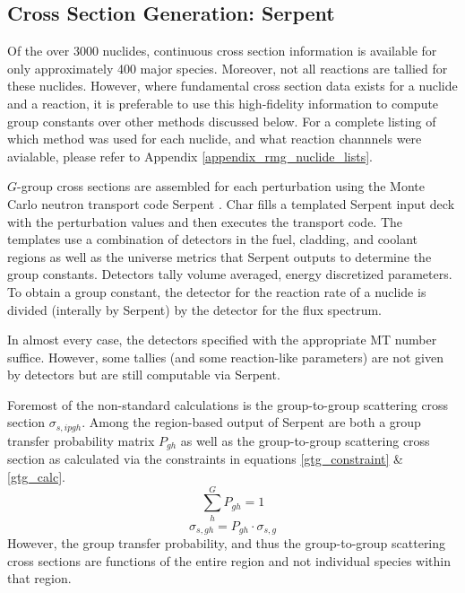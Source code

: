 \subsection{Cross Section Generation: Serpent}
\label{mg:xs_gen_serpent}
Of the over 3000 nuclides, continuous cross section information is available for only 
approximately 400 major species.  Moreover, not all reactions are tallied 
for these nuclides.  However, where fundamental cross section data exists for a nuclide
and a reaction, it is preferable to use this high-fidelity information to compute group
constants over other methods discussed below.  For a complete listing of which method was used for each nuclide, 
and what reaction channnels were avialable, please refer to Appendix \ref{appendix_rmg_nuclide_lists}.

$G$-group cross sections are assembled for each perturbation using the Monte Carlo neutron
transport code Serpent \cite{Lepp2011}.  Char fills a templated Serpent input deck with the
perturbation values and then executes the transport code.  The templates use a combination 
of detectors in the fuel, cladding, and coolant regions as well as the universe metrics that 
Serpent outputs to determine the group constants.  Detectors tally volume averaged, energy 
discretized parameters.  To obtain a group constant, the detector for the reaction rate of 
a nuclide is divided (interally by Serpent) by the detector for the flux spectrum.

In almost every case, the detectors specified with the appropriate MT number suffice.  
However, some tallies (and some reaction-like parameters) are not given by detectors
but are still computable via Serpent.

Foremost of the non-standard calculations is the group-to-group scattering cross section
$\sigma_{s,ipgh}$.  Among the region-based output of Serpent are both a group transfer
probability matrix $P_{gh}$ as well as the group-to-group scattering cross section
as calculated via the constraints in equations \ref{gtg_constraint} \& \ref{gtg_calc}.
\begin{equation}
\label{gtg_constraint}
\sum_h^G P_{gh} = 1
\end{equation}
\begin{equation}
\label{gtg_calc}
\sigma_{s,gh} = P_{gh} \cdot \sigma_{s,g}
\end{equation}
However, the group transfer probability, and thus the group-to-group scattering cross sections
are functions of the entire region and not individual species within that region.  

